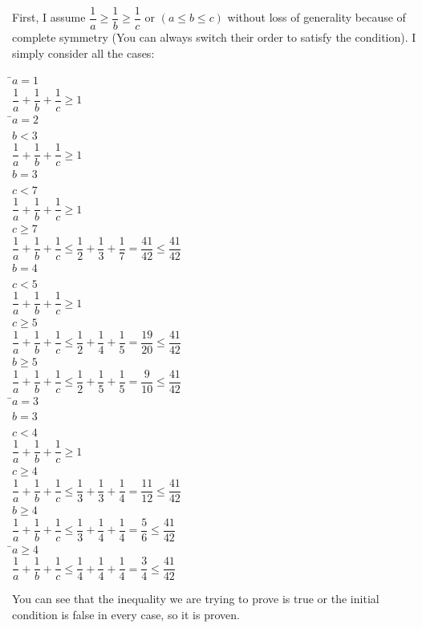 \documentclass[12pt, oneside]{article}
\begin{document}
First, I assume $\dfrac{1}{a} \geq \dfrac{1}{b} \geq \dfrac{1}{c} \text{ or } (a\leq b\leq c)$ without loss of generality because of complete symmetry (You can always switch their order to satisfy the condition). I simply consider all the cases:
\pagebreak
\begin{tabbing}
\=$a=1$\=\\
\>\>$\dfrac{1}{a}+\dfrac{1}{b}+\dfrac{1}{c}\geq1$\=\\
\=$a=2$\=\\
\>\>$b<3$\=\\
\>\>\>$\dfrac{1}{a}+\dfrac{1}{b}+\dfrac{1}{c}\geq1$\=\\
\>\>$b=3$\=\\
\>\>\>$c<7$\=\\
\>\>\>\>$\dfrac{1}{a}+\dfrac{1}{b}+\dfrac{1}{c}\geq1$\=\\
\>\>\>$c\geq7$\=\\
\>\>\>\>$\dfrac{1}{a}+\dfrac{1}{b}+\dfrac{1}{c}\leq\dfrac{1}{2}+\dfrac{1}{3}+\dfrac{1}{7}=\dfrac{41}{42}\leq\dfrac{41}{42}$\=\\
\>\>$b=4$\=\\
\>\>\>$c<5$\=\\
\>\>\>\>$\dfrac{1}{a}+\dfrac{1}{b}+\dfrac{1}{c}\geq1$\=\\
\>\>\>$c\geq5$\=\\
\>\>\>\>$\dfrac{1}{a}+\dfrac{1}{b}+\dfrac{1}{c}\leq\dfrac{1}{2}+\dfrac{1}{4}+\dfrac{1}{5}=\dfrac{19}{20}\leq\dfrac{41}{42}$\=\\
\>\>$b\geq5$\=\\
\>\>\>$\dfrac{1}{a}+\dfrac{1}{b}+\dfrac{1}{c}\leq\dfrac{1}{2}+\dfrac{1}{5}+\dfrac{1}{5}=\dfrac{9}{10}\leq\dfrac{41}{42}$\=\\
\=$a=3$\=\\
\>\>$b=3$\=\\
\>\>\>$c<4$\=\\
\>\>\>\>$\dfrac{1}{a}+\dfrac{1}{b}+\dfrac{1}{c}\geq1$\=\\
\>\>\>$c\geq4$\=\\
\>\>\>\>$\dfrac{1}{a}+\dfrac{1}{b}+\dfrac{1}{c}\leq\dfrac{1}{3}+\dfrac{1}{3}+\dfrac{1}{4}=\dfrac{11}{12}\leq\dfrac{41}{42}$\=\\
\>\>$b\geq4$\=\\
\>\>\>$\dfrac{1}{a}+\dfrac{1}{b}+\dfrac{1}{c}\leq\dfrac{1}{3}+\dfrac{1}{4}+\dfrac{1}{4}=\dfrac{5}{6}\leq\dfrac{41}{42}$\=\\
\=$a\geq4$\=\\
\>\>$\dfrac{1}{a}+\dfrac{1}{b}+\dfrac{1}{c}\leq\dfrac{1}{4}+\dfrac{1}{4}+\dfrac{1}{4}=\dfrac{3}{4}\leq\dfrac{41}{42}$\=\\
\end{tabbing}
You can see that the inequality we are trying to prove is true or the initial condition is false in every case, so it is proven.
\end{document}
